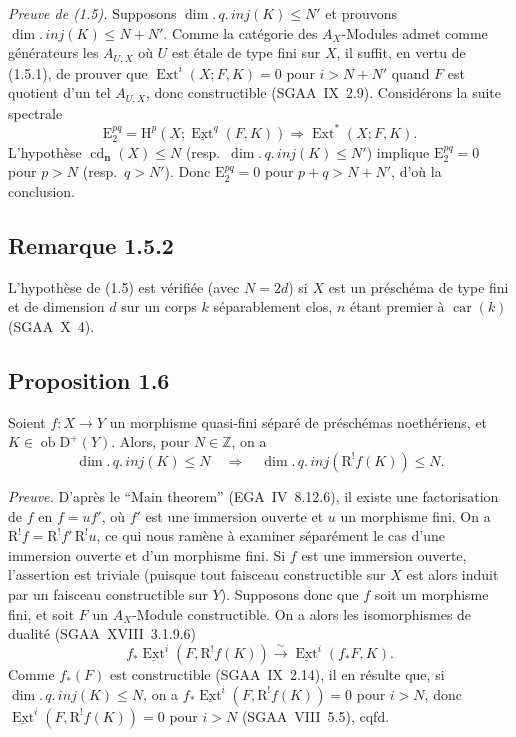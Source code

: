 \documentclass[11pt]{article}
\renewcommand{\H}{\mathrm{H}}
\DeclareMathOperator{\Ext}{Ext}
\DeclareMathOperator{\cd}{cd}
\newcommand{\R}{\mathrm{R}}
\newcommand{\D}{\mathrm{D}}
\newcommand{\Z}{\mathbb{Z}}
\newcommand{\E}{\mathrm{E}}
\newcommand{\ob}{\operatorname{ob}}
\newcommand{\car}{\operatorname{car}}
\providecommand{\car}{\operatorname{car}}
\providecommand{\ob}{\operatorname{ob}}
\providecommand{\car}{\operatorname{car}}
\providecommand{\R}{\mathrm R}
\providecommand{\Z}{\mathbb Z}
\providecommand{\car}{\operatorname{car}}
\begin{document}
\emph{Preuve de (1.5).} Supposons $\dim.\,q.\,inj(K) \leqslant N'$ et prouvons $\dim.\,inj(K) \leqslant N + N'$. Comme la catégorie des $A_X$-Modules admet comme générateurs les $A_{U,X}$ où $U$ est étale de type fini sur $X$, il suffit, en vertu de (1.5.1), de prouver que $\Ext^i(X; F,K) = 0$ pour $i > N + N'$ quand $F$ est quotient d'un tel $A_{U,X}$, donc constructible (SGAA~IX~2.9). Considérons la suite spectrale
\[
\E_2^{pq} = \H^p(X; \underline{\Ext}^q(F,K)) \Rightarrow \Ext^{*}(X; F,K).
\]
L'hypothèse $\cd_{\mathbf{n}}(X) \leqslant N$ (resp.~$\dim.\,q.\,inj(K) \leqslant N'$) implique $\E_2^{pq} = 0$ pour $p > N$ (resp.~$q > N'$). Donc $\E_2^{pq} = 0$ pour $p+q > N+N'$, d'où la conclusion.

\subsection*{Remarque 1.5.2}
L'hypothèse de (1.5) est vérifiée (avec $N = 2d$) si $X$ est un préschéma de type fini et de dimension $d$ sur un corps $k$ séparablement clos, $n$ étant premier à $\car(k)$ (SGAA~X~4).

\subsection*{Proposition 1.6}
Soient $f : X \to Y$ un morphisme quasi-fini séparé de préschémas noethériens, et $K \in \ob \D^{+}(Y)$. Alors, pour $N \in \Z$, on a
\[
\dim.\,q.\,inj(K) \leqslant N \quad \Longrightarrow \quad \dim.\,q.\,inj(\R^{!}f(K)) \leqslant N.
\]

\emph{Preuve.} D'après le ``Main theorem'' (EGA~IV~8.12.6), il existe une factorisation de $f$ en $f = uf'$, où $f'$ est une immersion ouverte et $u$ un morphisme fini. On a $\R^{!}f = \R^{!}f' \, \R^{!}u$, ce qui nous ramène à examiner séparément le cas d'une immersion ouverte et d'un morphisme fini. Si $f$ est une immersion ouverte, l'assertion est triviale (puisque tout faisceau constructible sur $X$ est alors induit par un faisceau constructible sur $Y$). Supposons donc que $f$ soit un morphisme fini, et soit $F$ un $A_X$-Module constructible. On a alors les isomorphismes de dualité (SGAA~XVIII~3.1.9.6)
\[
f_{*}\underline{\Ext}^i(F, \R^{!}f(K)) \xrightarrow{\sim} \underline{\Ext}^i(f_{*}F, K).
\]
Comme $f_{*}(F)$ est constructible (SGAA~IX~2.14), il en résulte que, si $\dim.\,q.\,inj(K) \leqslant N$, on a $f_{*}\underline{\Ext}^i(F, \R^{!}f(K)) = 0$ pour $i > N$, donc $\underline{\Ext}^i(F, \R^{!}f(K)) = 0$ pour $i > N$ (SGAA~VIII~5.5), cqfd.
\end{document}
